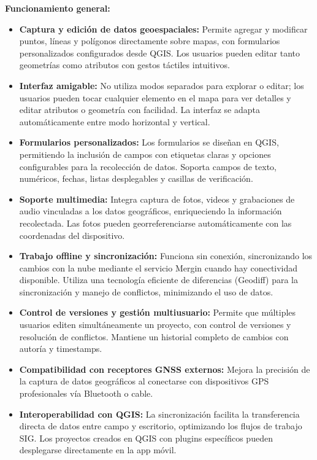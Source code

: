\documentclass{article}
\begin{document}
\textbf{Funcionamiento general:}
\begin{itemize}
  \item \textbf{Captura y edición de datos geoespaciales:} Permite agregar y modificar puntos, líneas y polígonos directamente sobre mapas, con formularios personalizados configurados desde QGIS. Los usuarios pueden editar tanto geometrías como atributos con gestos táctiles intuitivos.
  
  \item \textbf{Interfaz amigable:} No utiliza modos separados para explorar o editar; los usuarios pueden tocar cualquier elemento en el mapa para ver detalles y editar atributos o geometría con facilidad. La interfaz se adapta automáticamente entre modo horizontal y vertical.
  
  \item \textbf{Formularios personalizados:} Los formularios se diseñan en QGIS, permitiendo la inclusión de campos con etiquetas claras y opciones configurables para la recolección de datos. Soporta campos de texto, numéricos, fechas, listas desplegables y casillas de verificación.
  
  \item \textbf{Soporte multimedia:} Integra captura de fotos, videos y grabaciones de audio vinculadas a los datos geográficos, enriqueciendo la información recolectada. Las fotos pueden georreferenciarse automáticamente con las coordenadas del dispositivo.
  
  \item \textbf{Trabajo offline y sincronización:} Funciona sin conexión, sincronizando los cambios con la nube mediante el servicio Mergin cuando hay conectividad disponible. Utiliza una tecnología eficiente de diferencias (Geodiff) para la sincronización y manejo de conflictos, minimizando el uso de datos.
  
  \item \textbf{Control de versiones y gestión multiusuario:} Permite que múltiples usuarios editen simultáneamente un proyecto, con control de versiones y resolución de conflictos. Mantiene un historial completo de cambios con autoría y timestamps.
  
  \item \textbf{Compatibilidad con receptores GNSS externos:} Mejora la precisión de la captura de datos geográficos al conectarse con dispositivos GPS profesionales vía Bluetooth o cable.
  
  \item \textbf{Interoperabilidad con QGIS:} La sincronización facilita la transferencia directa de datos entre campo y escritorio, optimizando los flujos de trabajo SIG. Los proyectos creados en QGIS con plugins específicos pueden desplegarse directamente en la app móvil.
\end{itemize}
\end{document}
